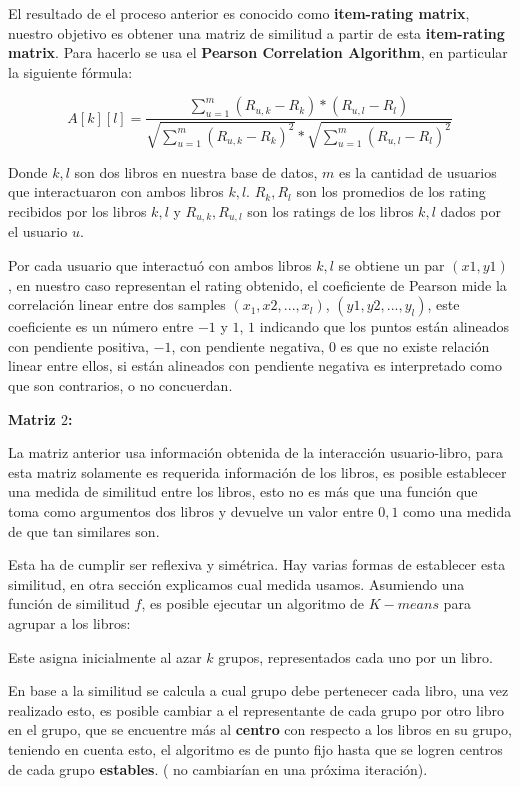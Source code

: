 \documentclass[14pt]{extarticle}
\begin{document}
El resultado de el proceso anterior es conocido como \textbf{item-rating matrix}, nuestro objetivo es obtener una matriz de similitud a partir de esta \textbf{item-rating matrix}. Para hacerlo se usa el \textbf{Pearson Correlation Algorithm}, en particular la siguiente fórmula:

$$A[k][l] = \frac{ \sum_{u = 1}^m (R_{u,k} - R_k)*(R_{u,l} - R_l) }{ \sqrt{\sum_{u = 1}^m (R_{u,k} - R_k)^2} * \sqrt{\sum_{u = 1}^m (R_{u,l} - R_l)^2} }$$

Donde $k, l$ son dos libros en nuestra base de datos, $m$ es la cantidad de usuarios que interactuaron con ambos libros $k, l$. $R_k,R_l$ son los promedios de los rating recibidos por los libros $k, l$ y $R_{u,k}, R_{u,l}$ son los ratings de los libros $k, l$ dados por el usuario $u$. 

Por cada usuario que interactuó con ambos libros $k,l$ se obtiene un par $(x1, y1)$, en nuestro caso representan el rating obtenido, el coeficiente de Pearson mide la correlación linear entre dos samples $(x_1, x2, ..., x_l)$, $(y1, y2, ..., y_l)$, este coeficiente es un número entre $-1$ y $1$, $1$ indicando que los puntos están alineados con pendiente positiva, $-1$, con pendiente negativa, $0$ es que no existe relación linear entre ellos, si están alineados con pendiente negativa es interpretado como que son contrarios, o no concuerdan.

\textbf{Matriz $2$:}

La matriz anterior usa información obtenida de la interacción usuario-libro, para esta matriz solamente es requerida información de los libros, es posible establecer una medida de similitud entre los libros, esto no es más que una función que toma como argumentos dos libros y devuelve un valor entre $0, 1$ como una medida de que tan similares son. 

Esta ha de cumplir ser reflexiva y simétrica. Hay varias formas de establecer esta similitud, en otra sección explicamos cual medida usamos. Asumiendo una función de similitud $f$, es posible ejecutar un algoritmo de $K-means$ para agrupar a los libros:

Este asigna inicialmente al azar $k$ grupos, representados cada uno por un libro.

En base a la similitud se calcula a cual grupo debe pertenecer cada libro, una vez realizado esto, es posible cambiar a el representante de cada grupo por otro libro en el grupo, que se encuentre más al \textbf{centro} con respecto a los libros en su grupo, teniendo en cuenta esto, el algoritmo es de punto fijo hasta que se logren centros de cada grupo \textbf{estables}. ( no cambiarían en una próxima iteración). 
\end{document}
